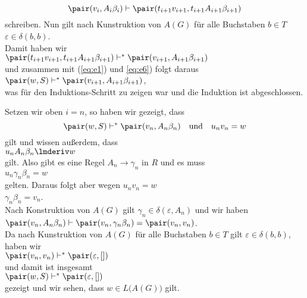 \begin{enumerate}
\begin{equation}
              \label{eq:e6}
              \pair(v_i,A_i \beta_i) \vdash \pair(t_{i+1}v_{i+1},t_{i+1}A_{i+1} \beta_{i+1})
            \end{equation}
            schreiben.  Nun gilt nach Kunstruktion von $A(G)$ f\"ur alle Buchstaben
            $b \in T$
            \\[0.2cm]
            \hspace*{1.3cm}
            $\varepsilon \in \delta(b,b)$.
            \\[0.2cm]
            Damit haben wir
            \\[0.2cm]
            \hspace*{1.3cm}
            $\pair(t_{i+1}v_{i+1},t_{i+1}A_{i+1} \beta_{i+1}) \vdash^* \pair(v_{i+1},A_{i+1} \beta_{i+1})$
            \\[0.2cm]
            und zusammen mit (\ref{eq:e1}) und \ref{eq:e6}) folgt daraus
            \\[0.2cm]
            \hspace*{1.3cm}
            $\pair(w,S) \vdash^* \pair(v_{i+1},A_{i+1} \beta_{i+1})$,
            \\[0.2cm]
            was f\"ur den Induktions-Schritt zu zeigen war und die Induktion ist abgeschlossen.
\end{enumerate}
Setzen wir oben $i=n$, so haben wir gezeigt, dass
\begin{equation}
  \label{eq:e7}
  \pair(w,S) \vdash^* \pair(v_n, A_n\beta_n) \quad \mbox{und} \quad u_nv_n = w
\end{equation}
gilt und wissen au{\ss}erdem, dass 
\\[0.2cm]
\hspace*{1.3cm}
$u_n A_n \beta_n \lmderiv w$
\\[0.2cm]
gilt. Also gibt es eine Regel $A_n \rightarrow \gamma_n$ in $R$ und es muss
\\[0.2cm]
\hspace*{1.3cm}
$u_n \gamma_n \beta_n = w$
\\[0.2cm]
gelten.  Daraus folgt aber wegen $u_n v_n = w$
\\[0.2cm]
\hspace*{1.3cm}
$\gamma_n \beta_n = v_n$.
\\[0.2cm]
Nach Konstruktion von $A(G)$ gilt $\gamma_n \in \delta(\varepsilon, A_n)$ und wir
haben
\\[0.2cm]
\hspace*{1.3cm}
$\pair(v_n, A_n\beta_n) \vdash \pair(v_n, \gamma_n \beta_n) = \pair(v_n, v_n)$.
\\[0.2cm]
Da nach Kunstruktion von $A(G)$ f\"ur alle Buchstaben
$b \in T$ gilt $\varepsilon \in \delta(b,b)$,  haben wir
\\[0.2cm]
\hspace*{1.3cm}
$\pair(v_n, v_n) \vdash^* \pair(\varepsilon, [])$
\\[0.2cm]
und damit ist insgesamt
\\[0.2cm]
\hspace*{1.3cm}
$\pair(w,S) \vdash^* \pair(\varepsilon, [])$
\\[0.2cm]
gezeigt und wir sehen, dass $w \in L\bigl(A(G)\bigr)$ gilt.
\vspace*{0.3cm}

